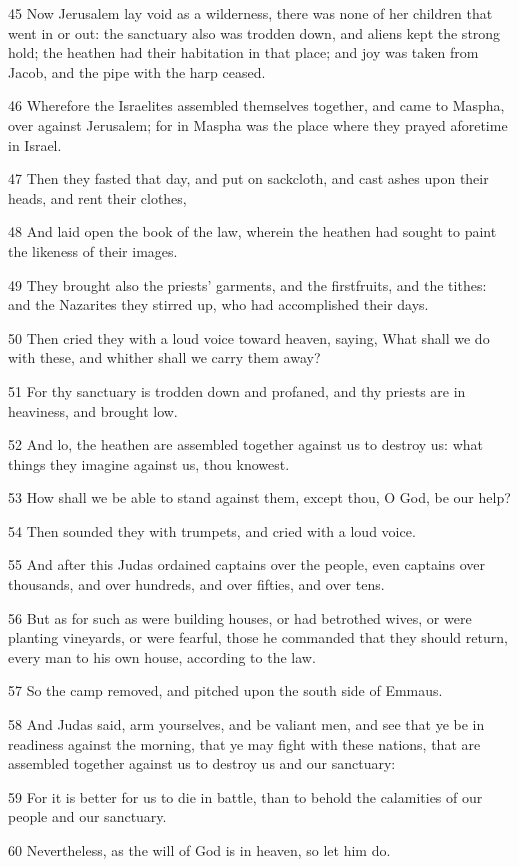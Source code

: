 \par 45 Now Jerusalem lay void as a wilderness, there was none of her children that went in or out: the sanctuary also was trodden down, and aliens kept the strong hold; the heathen had their habitation in that place; and joy was taken from Jacob, and the pipe with the harp ceased.
\par 46 Wherefore the Israelites assembled themselves together, and came to Maspha, over against Jerusalem; for in Maspha was the place where they prayed aforetime in Israel.
\par 47 Then they fasted that day, and put on sackcloth, and cast ashes upon their heads, and rent their clothes,
\par 48 And laid open the book of the law, wherein the heathen had sought to paint the likeness of their images.
\par 49 They brought also the priests' garments, and the firstfruits, and the tithes: and the Nazarites they stirred up, who had accomplished their days.
\par 50 Then cried they with a loud voice toward heaven, saying, What shall we do with these, and whither shall we carry them away?
\par 51 For thy sanctuary is trodden down and profaned, and thy priests are in heaviness, and brought low.
\par 52 And lo, the heathen are assembled together against us to destroy us: what things they imagine against us, thou knowest.
\par 53 How shall we be able to stand against them, except thou, O God, be our help?
\par 54 Then sounded they with trumpets, and cried with a loud voice.
\par 55 And after this Judas ordained captains over the people, even captains over thousands, and over hundreds, and over fifties, and over tens.
\par 56 But as for such as were building houses, or had betrothed wives, or were planting vineyards, or were fearful, those he commanded that they should return, every man to his own house, according to the law.
\par 57 So the camp removed, and pitched upon the south side of Emmaus.
\par 58 And Judas said, arm yourselves, and be valiant men, and see that ye be in readiness against the morning, that ye may fight with these nations, that are assembled together against us to destroy us and our sanctuary:
\par 59 For it is better for us to die in battle, than to behold the calamities of our people and our sanctuary.
\par 60 Nevertheless, as the will of God is in heaven, so let him do.

